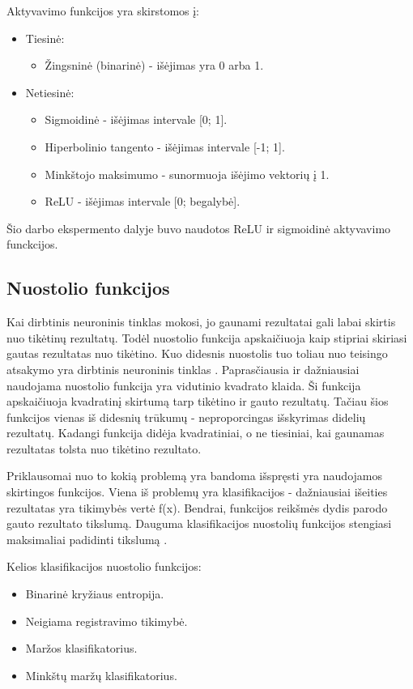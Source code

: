 \documentclass{VUMIFPSkursinis}
\begin{document}
Aktyvavimo funkcijos yra skirstomos į:
\begin{itemize}
\item Tiesinė: 
\begin{itemize}
\item Žingsninė (binarinė) - išėjimas yra 0 arba 1.
\end{itemize}
\item Netiesinė: 
\begin{itemize}
\item Sigmoidinė - išėjimas intervale [0; 1].
\item Hiperbolinio tangento - išėjimas intervale [-1; 1].
\item Minkštojo maksimumo - sunormuoja išėjimo vektorių į 1.
\item ReLU - išėjimas intervale [0; begalybė].
\end{itemize}
\end{itemize}

Šio darbo ekspermento dalyje buvo naudotos ReLU ir sigmoidinė aktyvavimo funckcijos.

\subsection{Nuostolio funkcijos}
Kai dirbtinis neuroninis tinklas mokosi, jo gaunami rezultatai gali labai skirtis nuo tikėtinų rezultatų. Todėl nuostolio funkcija apskaičiuoja kaip stipriai
skiriasi gautas rezultatas nuo tikėtino. Kuo didesnis nuostolis tuo toliau nuo teisingo atsakymo yra dirbtinis neuroninis tinklas \cite{Cameron-loss-fun}.
Paprasčiausia ir dažniausiai naudojama nuostolio funkcija yra vidutinio kvadrato klaida. Ši funkcija apskaičiuoja kvadratinį skirtumą tarp tikėtino 
ir gauto rezultatų. Tačiau šios funkcijos vienas iš didesnių trūkumų - neproporcingas išskyrimas didelių rezultatų. Kadangi funkcija didėja kvadratiniai,
o ne tiesiniai, kai gaunamas rezultatas tolsta nuo tikėtino rezultato.

Priklausomai nuo to kokią problemą yra bandoma išspręsti yra naudojamos skirtingos funkcijos. Viena iš problemų yra klasifikacijos - dažniausiai išeities
rezultatas yra tikimybės vertė f(x). Bendrai, funkcijos reikšmės dydis parodo gauto rezultato tikslumą. Dauguma klasifikacijos nuostolių funkcijos stengiasi
maksimaliai padidinti tikslumą \cite{clas-loss-2017}. 


Kelios klasifikacijos nuostolio funkcijos:
\begin{itemize}
\item Binarinė kryžiaus entropija.
\item Neigiama registravimo tikimybė.
\item Maržos klasifikatorius.
\item Minkštų maržų klasifikatorius.
\end{itemize}
\end{document}
